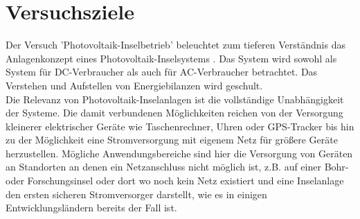 \section{Versuchsziele}
Der Versuch 'Photovoltaik-Inselbetrieb' beleuchtet zum tieferen Verständnis das Anlagenkonzept eines Photovoltaik-Inselsystems . Das System wird sowohl als System 
 für DC-Verbraucher als auch für AC-Verbraucher betrachtet. Das
 Verstehen und Aufstellen von Energiebilanzen wird geschult.\\
 Die Relevanz von Photovoltaik-Inselanlagen ist die vollständige Unabhängigkeit der Systeme. Die damit verbundenen Möglichkeiten reichen von der Versorgung kleinerer elektrischer Geräte wie Taschenrechner, Uhren oder GPS-Tracker bis hin zu der Möglichkeit eine Stromversorgung mit eigenem Netz für größere Geräte herzustellen.
 Mögliche Anwendungsbereiche sind hier die Versorgung von Geräten an Standorten
 an denen ein Netzanschluss nicht möglich ist, z.B. auf einer Bohr- oder Forschungsinsel
 oder dort wo noch kein Netz existiert und eine Inselanlage den ersten sicheren
 Stromversorger darstellt, wie es in einigen Entwicklungsländern bereits der Fall ist.\\
